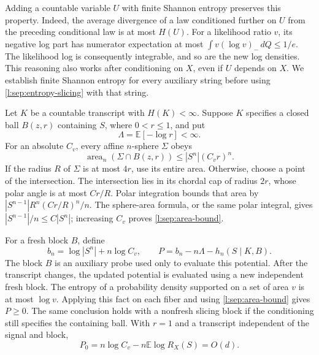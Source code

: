 Adding a countable variable \(U\) with finite Shannon entropy
preserves this property.  Indeed, the average divergence of a law
conditioned further on \(U\) from the preceding conditional law is
at most \(H(U)\).  For a likelihood ratio \(v\), its negative log
part has numerator expectation at most
\(\int v(\log v)_-\,dQ\le1/e\).  The likelihood log is consequently
integrable, and so are the new log densities.  This reasoning also
works after conditioning on \(X\), even if \(U\) depends on \(X\).
We establish finite Shannon entropy for every auxiliary string before
using \eqref{l:sep:entropy-slicing} with that string.

Let \(K\) be a countable transcript with \(H(K)<\infty\).  Suppose
\(K\) specifies a closed ball \(B(z,r)\) containing \(S\), where
\(0<r\le1\), and put
\[
 \Lambda=\mathbb E[-\log r]<\infty.
\]
For an absolute \(C_v\), every affine \(n\)-sphere \(\Sigma\) obeys
\begin{equation}
 \operatorname{area}_n(\Sigma\cap B(z,r))
       \le |S^n|(C_vr)^n.
 \label{l:sep:area-bound}
\end{equation}
If the radius \(R\) of \(\Sigma\) is at most \(4r\), use its entire
area.  Otherwise, choose a point of the intersection.  The
intersection lies in its chordal cap of radius \(2r\), whose polar
angle is at most \(Cr/R\).  Polar integration bounds that area by
\(|S^{n-1}|R^n(Cr/R)^n/n\).  The sphere-area formula, or the same
polar integral, gives \(|S^{n-1}|/n\le C|S^n|\); increasing \(C_v\)
proves \eqref{l:sep:area-bound}.

For a fresh block \(B\), define
\begin{equation}
 b_n=\log|S^n|+n\log C_v,\qquad
 P=b_n-n\Lambda-h_n(S\mid K,B).
 \label{l:sep:potential}
\end{equation}
The block \(B\) is an auxiliary probe used only to evaluate this
potential.  After the transcript changes, the updated potential is
evaluated using a new independent fresh block.
The entropy of a probability density supported on a set of area
\(v\) is at most \(\log v\).  Applying this fact on each fiber and
using \eqref{l:sep:area-bound} gives \(P\ge0\).  The same conclusion
holds with a nonfresh slicing block if the conditioning still
specifies the containing ball.  With \(r=1\) and a transcript
independent of the signal and block,
\[
 P_0=n\log C_v-n\mathbb E\log R_X(S)=O(d).
\]

